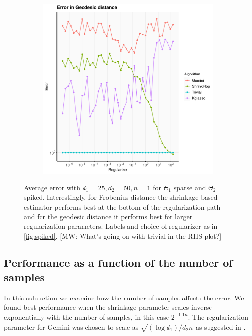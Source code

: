 \documentclass[aos]{imsart}
\theoremstyle{definition}
\numberwithin{equation}{section}
\newcommand{\MW}[1]{{\color{red}[MW: #1]}}
\newcommand{\MW}[1]{{}}
\begin{document}
\begin{figure}
\begin{subfigure}[b]{.4\textwidth}
         \includegraphics[width=\textwidth]{./code/zhou-comparison/25-50-sparse-geo.pdf}
         \end{subfigure}
\caption{Average error with $d_1 = 25, d_2 = 50, n = 1$ for $\Theta_1$ sparse and $\Theta_2$ spiked. Interestingly, for Frobenius distance the shrinkage-based estimator performs best at the bottom of the regularization path and for the geodesic distance it performs best for larger regularization parameters.
Labels and choice of regularizer as in \cref{fig:spiked}.
\MW{What's going on with trivial in the RHS plot?}}\label{fig:sparse-i}
\end{figure}

\subsection{Performance as a function of the number of samples}
In this subsection we examine how the number of samples affects the error. We found best performance when the shrinkage parameter scales inverse exponentially with the number of samples, in this case $2^{-1.1 n}$. The regularization parameter for Gemini was chosen to scale as $\sqrt{(\log d_1) / d_2 n}$ as suggested in \cite{zhou2014gemini}.
\end{document}
